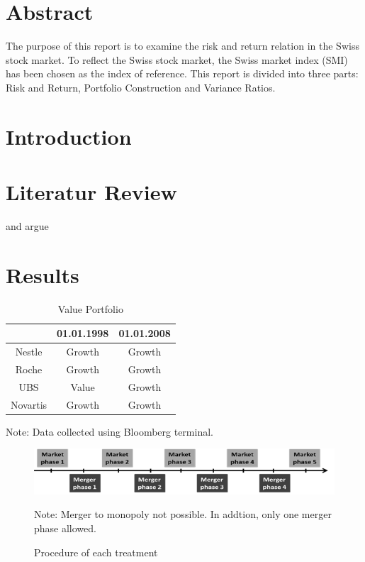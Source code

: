 \documentclass{article}
\begin{document}
\vspace*{2cm}


\section*{Abstract}
 
The purpose of this report is to examine the risk and return relation in the Swiss stock market. To reflect the Swiss stock market, the Swiss market index (SMI) has been chosen as the index of reference. This report is divided into three parts: Risk and Return, Portfolio Construction and Variance Ratios.

\newpage


\tableofcontents
\newpage

\section{Introduction}
\blindtext
\newpage

\section{Literatur Review}

\cite{Milgrom1982} and \cite{Gormsen2020} argue \blindtext
\newpage

\section{Results}


\begin{table} [!h] \centering 
	\begin{threeparttable}
		\caption{Value Portfolio}
     	\begin{tabular}{ccc}
        	\toprule
				    	& 01.01.1998 & 01.01.2008\\ 
			\midrule
			Nestle  	& Growth 	& Growth \\
			Roche 		& Growth 	& Growth \\ 
			UBS 		& Value 	& Growth \\
			Novartis 	& Growth 	& Growth \\ 
			\bottomrule
		\end{tabular}
		\footnotesize Note: Data collected using Bloomberg terminal.
	\end{threeparttable}
\end{table}

\blindtext

\begin{figure} [!h]
	\caption{Procedure of each treatment}
 	\begin{centering}
		\includegraphics[width=0.8\linewidth]{phases} \\
	\end{centering}
	\footnotesize Note: Merger to monopoly not possible. In addtion, only one merger phase allowed. 
\end{figure}
\end{document}
